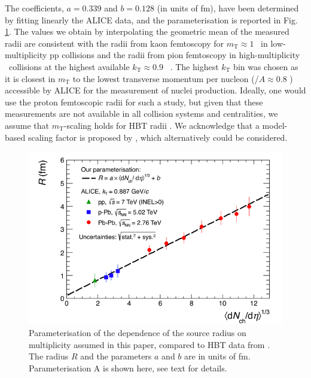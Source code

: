 The coefficients, $a = 0.339$ and $b = 0.128$ (in units of fm), have been determined by fitting linearly the ALICE data, and the parameterisation is reported in Fig. \ref{fig:radiiparam}. 
The values we obtain by interpolating the geometric mean of the measured radii are consistent with the radii from kaon femtoscopy for $m_{\mathrm{T}} \approx 1$ \GeVc~in low-multiplicity pp collisions \cite{Abelev:2012sq} and the radii from pion femtoscopy in high-multiplicity \PbPb~collisions at the highest available $k_{\mathrm{T}} \approx 0.9$ \GeVc~\cite{Adam:2015vna}. 
The highest $k_{\mathrm{T}}$ bin was chosen as it is closest in $m_{\mathrm{T}}$ to the lowest transverse momentum per nucleon (\pt/$A \approx 0.8$ \GeVc) accessible by ALICE for the measurement of nuclei production. 
Ideally, one would use the proton femtoscopic radii for such a study, but given that these measurements are not  available in all collision systems and centralities, we assume that $m_{\mathrm{T}}$-scaling holds for HBT radii \cite{Adam:2015vja}. We acknowledge that a model-based scaling factor is proposed by \cite{Kisiel:2014upa}, which alternatively could be considered.

\begin{figure}[htbp]
\begin{center}
\includegraphics[width=1\columnwidth]{../HbtRadiusParam.png}
\caption{Parameterisation of the dependence of the source radius on multiplicity assumed in this paper, compared to HBT data from \cite{Adam:2015vna, Adam:2015pya, Abelev:2012sq}. The radius $R$ and the parameters $a$ and $b$ are in units of fm. Parameterisation A is shown here, see text for details.}
\label{fig:radiiparam}
\end{center}
\end{figure}


